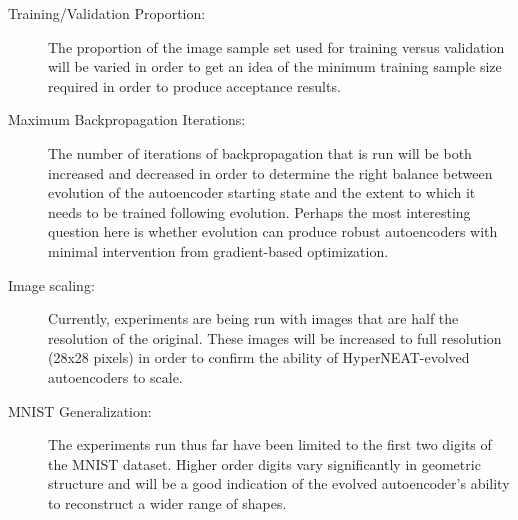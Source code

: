 \documentclass{acm_proc_article-sp}
\begin{document}
\begin{description}
	\item[Training/Validation Proportion:] The proportion of the image sample set used for training versus validation will be varied in order to get an idea of the minimum training sample size required in order to produce acceptance results.
	\item[Maximum Backpropagation Iterations:] The number of iterations of backpropagation that is run will be both increased and decreased in order to determine the right balance between evolution of the autoencoder starting state and the extent to which it needs to be trained following evolution.  Perhaps the most interesting question here is whether evolution can produce robust autoencoders with minimal intervention from gradient-based optimization.
	\item[Image scaling:] Currently, experiments are being run with images that are half the resolution of the original.  These images will be increased to full resolution (28x28 pixels) in order to confirm the ability of HyperNEAT-evolved autoencoders to scale.
	\item[MNIST Generalization:] The experiments run thus far have been limited to the first two digits of the MNIST dataset.  Higher order digits vary significantly in geometric structure and will be a good indication of the evolved autoencoder's ability to reconstruct a wider range of shapes.
\end{description}

\balancecolumns



\end{document}
